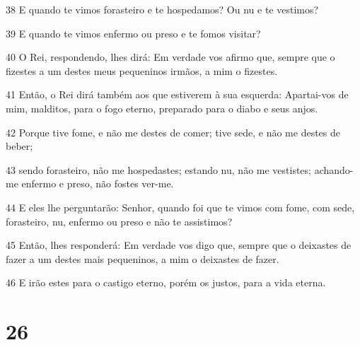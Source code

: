 \par 38 E quando te vimos forasteiro e te hospedamos? Ou nu e te vestimos?
\par 39 E quando te vimos enfermo ou preso e te fomos visitar?
\par 40 O Rei, respondendo, lhes dirá: Em verdade vos afirmo que, sempre que o fizestes a um destes meus pequeninos irmãos, a mim o fizestes.
\par 41 Então, o Rei dirá também aos que estiverem à sua esquerda: Apartai-vos de mim, malditos, para o fogo eterno, preparado para o diabo e seus anjos.
\par 42 Porque tive fome, e não me destes de comer; tive sede, e não me destes de beber;
\par 43 sendo forasteiro, não me hospedastes; estando nu, não me vestistes; achando-me enfermo e preso, não fostes ver-me.
\par 44 E eles lhe perguntarão: Senhor, quando foi que te vimos com fome, com sede, forasteiro, nu, enfermo ou preso e não te assistimos?
\par 45 Então, lhes responderá: Em verdade vos digo que, sempre que o deixastes de fazer a um destes mais pequeninos, a mim o deixastes de fazer.
\par 46 E irão estes para o castigo eterno, porém os justos, para a vida eterna.

\chapter{26}

